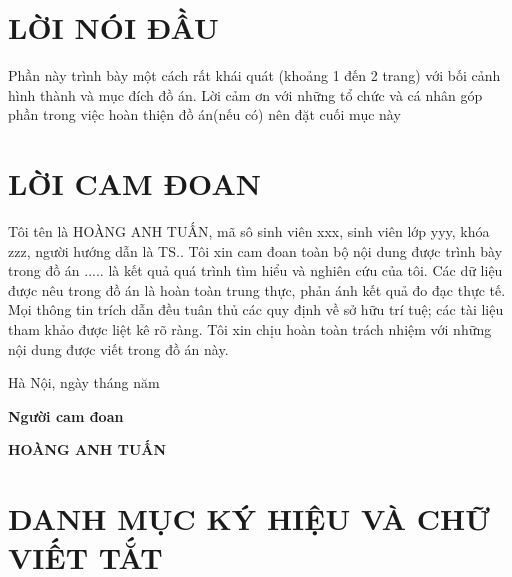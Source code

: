 \documentclass{article}%
\renewcommand{\figurename}{\fontsize{12pt}{0pt}\selectfont \bfseries Hình} %
\begin{document}
\cleardoublepage %
\section*{LỜI NÓI ĐẦU} %
\thispagestyle{empty}
Phần này trình bày một cách rất khái quát (khoảng 1 đến 2 trang) với bối cảnh hình thành và mục đích đồ án. 
Lời cảm ơn với những tổ chức và cá nhân góp phần trong việc hoàn thiện đồ án(nếu có) nên đặt cuối mục này

\cleardoublepage
\section*{LỜI CAM ĐOAN} %
\thispagestyle{empty}
Tôi tên là HOÀNG ANH TUẤN, mã sô sinh viên xxx, sinh viên lớp yyy, khóa zzz, người hướng dẫn là TS.. Tôi xin cam đoan toàn bộ nội dung được trình bày trong đồ án ..... là kết quả quá trình tìm hiểu và nghiên cứu 
của tôi. Các dữ liệu được nêu trong đồ án là hoàn toàn trung thực, phản ánh kết quả đo đạc thực tế. Mọi thông tin trích 
dẫn đều tuân thủ các quy định về sở hữu trí tuệ; các tài liệu tham khảo được liệt kê rõ ràng. Tôi xin chịu hoàn toàn trách 
nhiệm với những nội dung được viết trong đồ án này.

\vspace{6pt}

\hspace{7cm}Hà Nội, ngày  tháng   năm

\hspace{9cm}\textbf{Người cam đoan}

\vspace{2cm}
\hspace{8.65cm}\textbf{HOÀNG ANH TUẤN}

\cleardoublepage
{}
\tableofcontents %
\thispagestyle{empty}
\cleardoublepage

\section*{DANH MỤC KÝ HIỆU VÀ CHỮ VIẾT TẮT}%
\cleardoublepage

{
\let\oldnumberline\numberline
\renewcommand{\numberline}{\figurename~\oldnumberline}%
\listoffigures
} %
\cleardoublepage
\end{document}
